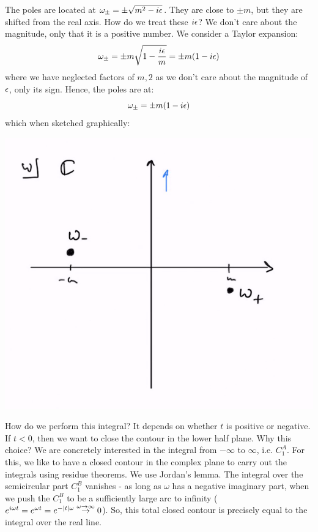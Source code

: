 The poles are located at $\omega_\pm = \pm \sqrt{m^2 - i\epsilon}$. They are close to $\pm m$, but they are shifted from the real axis. How do we treat these $i\epsilon$? We don't care about the magnitude, only that it is a positive number. We consider a Taylor expansion:
\begin{equation}
    \omega_\pm = \pm m\sqrt{1 - \frac{i\epsilon}{m}} = \pm m(1 - i\epsilon)
\end{equation}
where we have neglected factors of $m, 2$ as we don't care about the magnitude of $\epsilon$, only its sign. Hence, the poles are at:
\begin{equation}
    \omega_\pm = \pm m(1 - i\epsilon)
\end{equation}
which when sketched graphically:
\begin{center}
    \includegraphics[scale=0.8]{Lectures/Figures/Feynmanpoles.png}
\end{center}

How do we perform this integral? It depends on whether $t$ is positive or negative. If $t < 0$, then we want to close the contour in the lower half plane. Why this choice? We are concretely interested in the integral from $-\infty$ to $\infty$, i.e. $C_1^A$. For this, we like to have a closed contour in the complex plane to carry out the integrals using residue theorems. We use Jordan's lemma. The integral over the semicircular part $C_1^B$ vanishes - as long as $\omega$ has a negative imaginary part, when we push the $C_1^B$ to be a sufficiently large arc to infinity ($e^{i\omega t} = e^{\omega t} = e^{-\lvert t \rvert\omega} \stackrel{\omega\to\infty}{\to} 0$). So, this total closed contour is precisely equal to the integral over the real line.

